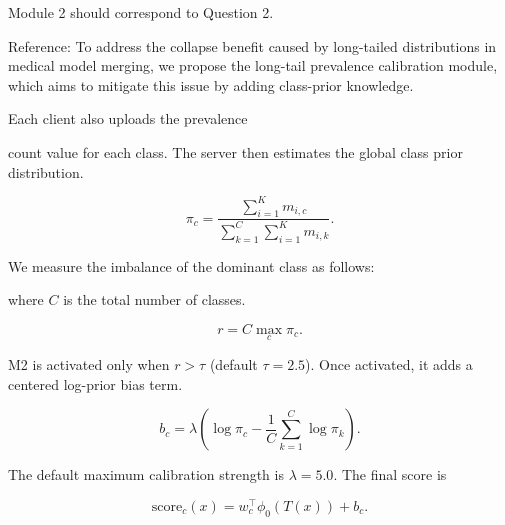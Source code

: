 \documentclass[letterpaper]{article}
\begin{document}
Module 2 should correspond to Question 2.


Reference: To address the collapse benefit caused by long-tailed distributions in medical model merging, we propose the long-tail prevalence calibration module, which aims to mitigate this issue by adding class-prior knowledge.


Each client also uploads the prevalence


count value for each class. The server then estimates the global class prior distribution.


\begin{equation}
\pi_c=\frac{\sum_{i=1}^{K}m_{i,c}}{\sum_{k=1}^{C}\sum_{i=1}^{K}m_{i,k}}.
\end{equation}

We measure the imbalance of the dominant class as follows:


where $C$ is the total number of classes.

\begin{equation}
r=C\max_c \pi_c.
\end{equation}

M2 is activated only when $r>\tau$ (default $\tau=2.5$). Once activated, it adds a centered log-prior bias term.


\begin{equation}
b_c=\lambda\left(\log \pi_c-\frac{1}{C}\sum_{k=1}^{C}\log \pi_k\right).
\end{equation}

The default maximum calibration strength is $\lambda=5.0$. The final score is


\begin{equation}
\mathrm{score}_c(x)=w_c^\top\phi_0(T(x))+b_c.
\end{equation}
\end{document}
